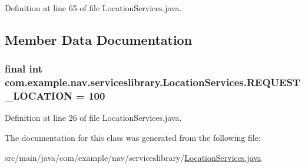 Definition at line 65 of file Location\+Services.\+java.



\subsection{Member Data Documentation}
\subsubsection[{\texorpdfstring{R\+E\+Q\+U\+E\+S\+T\+\_\+\+L\+O\+C\+A\+T\+I\+ON}{REQUEST_LOCATION}}]{\setlength{\rightskip}{0pt plus 5cm}final int com.\+example.\+nav.\+serviceslibrary.\+Location\+Services.\+R\+E\+Q\+U\+E\+S\+T\+\_\+\+L\+O\+C\+A\+T\+I\+ON = 100\hspace{0.3cm}{\ttfamily [static]}}\hypertarget{classcom_1_1example_1_1nav_1_1serviceslibrary_1_1_location_services_aad51d8eb23dff02420375ea7091b3b7d}{}\label{classcom_1_1example_1_1nav_1_1serviceslibrary_1_1_location_services_aad51d8eb23dff02420375ea7091b3b7d}


Definition at line 26 of file Location\+Services.\+java.



The documentation for this class was generated from the following file\+:\begin{DoxyCompactItemize}
\item 
src/main/java/com/example/nav/serviceslibrary/\hyperlink{_location_services_8java}{Location\+Services.\+java}\end{DoxyCompactItemize}
